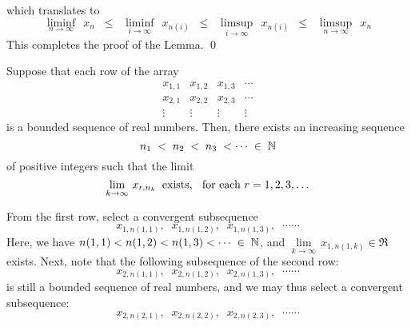 which translates to
\begin{equation*}
\underset{n\rightarrow\infty}{\liminf}\;\, x_{n}
\;\; \leq \;\;
	\underset{i\rightarrow\infty}{\liminf}\;\, x_{n(i)}
\;\;\leq\;\;
	\underset{i\rightarrow\infty}{\limsup}\;\, x_{n(i)}
\;\; \leq \;\;
	\underset{n\rightarrow\infty}{\limsup}\;\, x_{n}
\end{equation*}
This completes the proof of the Lemma.
\qed


\vskip 0.6cm
\begin{theorem}
\label{theorem:DiagonalMethod}
\mbox{}
\vskip 0.3cm
\noindent
Suppose that each row of the array
\begin{equation*}
\begin{array}{cccc}
x_{1,1} & x_{1,2} & x_{1,3} & \cdots \\
x_{2,1} & x_{2,2} & x_{2,3} & \cdots \\
\vdots & \vdots & \vdots & \vdots  
\end{array}
\end{equation*}
is a bounded sequence of real numbers.
Then, there exists an increasing sequence
\begin{equation*}
n_{1} \; < \; n_{2} \; < \; n_{3} \; < \cdots \; \in \; \mathbb{N}
\end{equation*}
of positive integers such that the limit
\begin{equation*}
\lim_{k\rightarrow\infty}\,x_{r,n_{k}}
\;\;\textnormal{exists, \;\;for each $r = 1, 2, 3, \ldots$}
\end{equation*}
\end{theorem}
\proof
From the first row, select a convergent subsequence
\begin{equation*}
x_{1,n(1,1)},\;\;
x_{1,n(1,2)},\;\; 
x_{1,n(1,3)},\;\;
\cdots\cdots 
\end{equation*}
Here, we have $n(1,1) < n(1,2) < n(1,3) < \cdots \;\in\;\mathbb{N}$, and
$\underset{k\rightarrow\infty}{\lim}\,x_{1,n(1,k)} \in \Re$ exists.
Next, note that the following subsequence of the second row:
\begin{equation*}
x_{2,n(1,1)},\;\;
x_{2,n(1,2)},\;\; 
x_{2,n(1,3)},\;\;
\cdots\cdots 
\end{equation*}
is still a bounded sequence of real numbers, and we may thus
select a convergent subsequence:
\begin{equation*}
x_{2,n(2,1)},\;\;
x_{2,n(2,2)},\;\; 
x_{2,n(2,3)},\;\;
\cdots\cdots 
\end{equation*}
